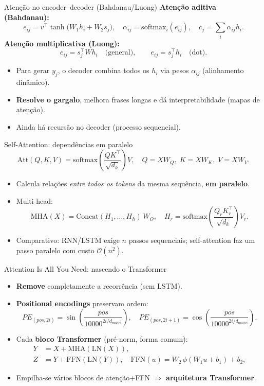 \documentclass{beamer}
\begin{document}
\begin{frame}{Atenção no encoder--decoder (Bahdanau/Luong)}
\textbf{Atenção aditiva (Bahdanau):}
\[
e_{ij} = v^\top \tanh\!\big(W_1 h_i + W_2 s_j\big),\quad
\alpha_{ij} = \mathrm{softmax}_i(e_{ij}),\quad
c_j = \sum_i \alpha_{ij} h_i .
\]
\textbf{Atenção multiplicativa (Luong):}
\[
e_{ij} = s_j^\top W h_i \quad \text{(general)}, \qquad
e_{ij} = s_j^\top h_i \quad \text{(dot)}.
\]
\begin{itemize}
  \item Para gerar $y_j$, o decoder combina todos os $h_i$ via pesos $\alpha_{ij}$ (alinhamento dinâmico).
  \item \textbf{Resolve o gargalo}, melhora frases longas e dá interpretabilidade (mapas de atenção).
  \item Ainda há recursão no decoder (processo sequencial).
\end{itemize}
\end{frame}

\begin{frame}{Self-Attention: dependências em paralelo}
\[
\mathrm{Att}(Q,K,V)=\mathrm{softmax}\!\left(\frac{QK^\top}{\sqrt{d_k}}\right)V,
\quad
Q = XW_Q,\; K = XW_K,\; V = XW_V.
\]
\begin{itemize}
  \item Calcula relações \emph{entre todos os tokens} da mesma sequência, \textbf{em paralelo}.
  \item Multi-head:
\[
\mathrm{MHA}(X)=\mathrm{Concat}(H_1,\dots,H_h)\,W_O,\quad
H_r=\mathrm{softmax}\!\left(\frac{Q_r K_r^\top}{\sqrt{d_k}}\right)V_r.
\]
  \item Comparativo: RNN/LSTM exige $n$ passos sequenciais; self-attention faz um passo paralelo com custo $\mathcal{O}(n^2)$.
\end{itemize}
\end{frame}

\begin{frame}{Attention Is All You Need: nascendo o Transformer}
\begin{itemize}
  \item \textbf{Remove} completamente a recorrência (sem LSTM).
  \item \textbf{Positional encodings} preservam ordem:
\[
PE_{(pos,2i)}=\sin\!\left(\frac{pos}{10000^{2i/d_{\text{model}}}}\right),\quad
PE_{(pos,2i+1)}=\cos\!\left(\frac{pos}{10000^{2i/d_{\text{model}}}}\right).
\]
  \item Cada \textbf{bloco Transformer} (pré-norm, forma comum):
\[
\begin{aligned}
Y &= X + \mathrm{MHA}(\mathrm{LN}(X)),\\
Z &= Y + \mathrm{FFN}(\mathrm{LN}(Y)),\quad \mathrm{FFN}(u)=W_2\,\phi(W_1u+b_1)+b_2,
\end{aligned}
\]
  \item Empilha-se vários blocos de atenção+FFN $\Rightarrow$ \textbf{arquitetura Transformer}.
\end{itemize}
\end{frame}
\end{document}
